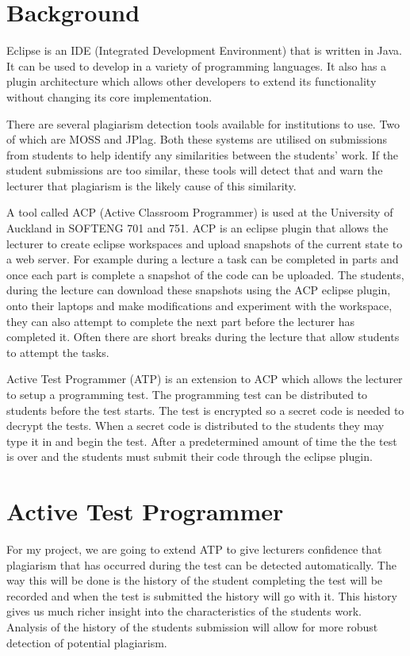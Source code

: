 \documentclass[twocolumn]{article}
\begin{document}
\section{Background}
Eclipse is an IDE (Integrated Development Environment) that is written in Java.
It can be used to develop in a variety of programming languages. It also has
a plugin architecture which allows other developers to extend its functionality
without changing its core implementation.

There are several plagiarism detection tools available for institutions to use.
Two of which are MOSS\cite{schleimer2003winnowing} and
JPlag\cite{lutz2000jplag}. Both these systems are utilised on submissions from
students to help identify any similarities between the students' work. If the student
submissions are too similar, these tools will detect that and warn the lecturer
that plagiarism is the likely cause of this similarity.

A tool called ACP (Active Classroom Programmer)\cite{giacaman2015active} is used
at the University of Auckland in SOFTENG 701 and 751. ACP is an eclipse
plugin that allows the lecturer to create eclipse workspaces and upload
snapshots of the current state to a web server. For example during a lecture a
task can be completed in parts and once each part is complete a snapshot of the
code can be uploaded. The students, during the lecture can download these
snapshots using the ACP eclipse plugin, onto their laptops and make
modifications and experiment with the workspace, they can also attempt to
complete the next part before the lecturer has completed it. Often there are
short breaks during the lecture that allow students to attempt the tasks.

Active Test Programmer (ATP) is an extension to ACP which allows the lecturer to
setup a programming test. The programming test can be distributed to students
before the test starts. The test is encrypted so a secret code is needed to
decrypt the tests. When a secret code is distributed to the students they may
type it in and begin the test. After a predetermined amount of time the the test
is over and the students must submit their code through the eclipse plugin.

\section{Active Test Programmer}
For my project, we are going to extend ATP to give lecturers confidence that
plagiarism that has occurred during the test can be detected automatically. The
way this will be done is the history of the student completing the test will be
recorded and when the test is submitted the history will go with it. This
history gives us much richer insight into the characteristics of the students
work. Analysis of the history of the students submission will allow for more
robust detection of potential plagiarism.
\end{document}
